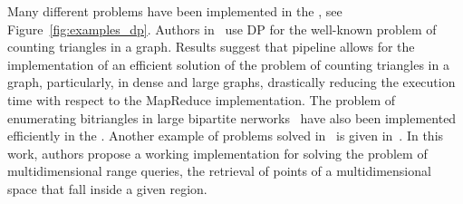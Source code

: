 Many different problems have been implemented in the \dpm, see Figure~\ref{fig:examples_dp}. Authors in~\cite{Pasarella2017} use DP for the well-known problem of counting 
triangles in a graph. Results suggest that pipeline allows for the implementation 
of an efficient solution of the problem of counting triangles in a graph, 
particularly, in dense and large graphs, drastically reducing the execution time 
with respect to the MapReduce implementation. The problem of enumerating bitriangles
in large bipartite nerworks~\cite{Royo_Sales_2021,Royo2021} have also been 
implemented efficiently in the \dpm. Another example of problems solved in \dpm\ is 
given in~\cite{Lugosi_Enes_2019}. In this work, authors propose a 
working implementation for solving the problem of multidimensional range queries, 
the retrieval of points of a multidimensional space that fall inside a given region.

